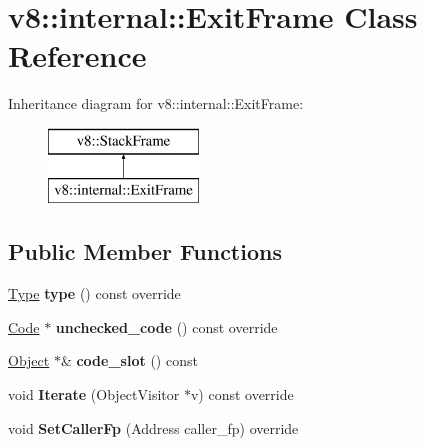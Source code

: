 \hypertarget{classv8_1_1internal_1_1_exit_frame}{}\section{v8\+:\+:internal\+:\+:Exit\+Frame Class Reference}
\label{classv8_1_1internal_1_1_exit_frame}
Inheritance diagram for v8\+:\+:internal\+:\+:Exit\+Frame\+:\begin{figure}[H]
\begin{center}
\leavevmode
\includegraphics[height=2.000000cm]{classv8_1_1internal_1_1_exit_frame}
\end{center}
\end{figure}
\subsection*{Public Member Functions}
\begin{DoxyCompactItemize}
\item 
\hyperlink{classv8_1_1internal_1_1_type}{Type} {\bfseries type} () const  override\hypertarget{classv8_1_1internal_1_1_exit_frame_a54042825caae6cfd5941be0df233a2f3}{}\label{classv8_1_1internal_1_1_exit_frame_a54042825caae6cfd5941be0df233a2f3}

\item 
\hyperlink{classv8_1_1internal_1_1_code}{Code} $\ast$ {\bfseries unchecked\+\_\+code} () const  override\hypertarget{classv8_1_1internal_1_1_exit_frame_a222d9802bc7f9a1176cf568376cf8aa8}{}\label{classv8_1_1internal_1_1_exit_frame_a222d9802bc7f9a1176cf568376cf8aa8}

\item 
\hyperlink{classv8_1_1internal_1_1_object}{Object} $\ast$\& {\bfseries code\+\_\+slot} () const \hypertarget{classv8_1_1internal_1_1_exit_frame_a537e0bc85afb3cb1ca71240a519c2185}{}\label{classv8_1_1internal_1_1_exit_frame_a537e0bc85afb3cb1ca71240a519c2185}

\item 
void {\bfseries Iterate} (Object\+Visitor $\ast$v) const  override\hypertarget{classv8_1_1internal_1_1_exit_frame_a51fd8009d805805a641b144a30114791}{}\label{classv8_1_1internal_1_1_exit_frame_a51fd8009d805805a641b144a30114791}

\item 
void {\bfseries Set\+Caller\+Fp} (Address caller\+\_\+fp) override\hypertarget{classv8_1_1internal_1_1_exit_frame_ab31eb64eccc246eaf7a1deeefcef2af4}{}\label{classv8_1_1internal_1_1_exit_frame_ab31eb64eccc246eaf7a1deeefcef2af4}

\end{DoxyCompactItemize}

